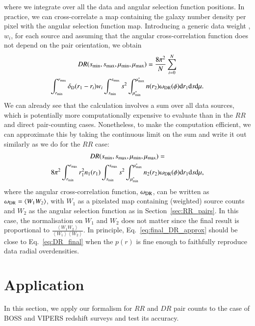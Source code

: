 \documentclass{aa}
\newcommand{\ev}[1]{\left\langle #1 \right\rangle}
\newcommand{\dd}{\mathrm{d}}
\begin{document}
%
where we integrate over all the data and angular selection function positions.
In practice, we can cross-correlate a map containing the galaxy number density per pixel with the angular selection function map. Introducing a generic data weight ,$w_i$, for each source and assuming that the angular cross-correlation function does not depend on the pair orientation, we obtain
%
\begin{multline}
  DR(s_{\rm min}, s_{\rm max}, \mu_{\rm min}, \mu_{\rm max})  =   \frac{8\pi^2}{N}\sum_{i=0}^N \\ \int_{r_{\rm min}}^{r_{\rm max}}\delta_{\rm D}(r_1-r_i)  w_i\int_{s_{\rm min}}^{s_{\rm max}}s^2\int_{\mu^*_{\rm min}}^{\mu^*_{\rm max}} n(r_2)\omega_{\rm DR}(\phi) \dd r_1\dd s\dd\mu.
  \label{eq:DR_final}
\end{multline}
%
We can already see that the calculation involves a sum over all data sources, which is potentially more computationally expensive to evaluate than in the $RR$ and direct pair-counting cases. Nonetheless, to make the computation efficient, we can approximate this by taking the continuous limit on the sum and write it out similarly as we do for the $RR$ case:
\begin{multline}
  DR(s_{\rm min}, s_{\rm max}, \mu_{\rm min}, \mu_{\rm max})  = \\
  8\pi^2 \int_{r_{\rm min}}^{r_{\rm max}}r_1^2 n_1(r_1)\int_{s_{\rm min}}^{s_{\rm max}}s^2\int_{\mu^*_{\rm min}}^{\mu^*_{\rm max}}n_2(r_2)\omega_{\rm DR}(\phi)\dd r_1\dd s\dd\mu,
  \label{eq:final_DR_approx}
\end{multline}
where the angular cross-correlation function, $\omega_{\rm DR}$, can be written as $\omega_{\rm DR} = \ev{W_1W_2}$, with $W_1$ as a pixelated map containing (weighted) source counts and $W_2$ as the angular selection function as in Section~\ref{sec:RR_pairs}. In this case, the normalisation on $W_1$ and $W_2$ does not matter since the final result is proportional to $\frac{\ev{W_1W_2}}{\ev{W_1}\ev{W_2}}$. In principle, Eq.~\eqref{eq:final_DR_approx} should be close to Eq.~\eqref{eq:DR_final} when the $p(r)$ is fine enough to faithfully reproduce data radial overdensities.

\section{Application} \label{sec:application}

In this section, we apply our formalism for $RR$ and $DR$ pair counts to the case of BOSS and VIPERS redshift surveys and test its accuracy.
\end{document}
